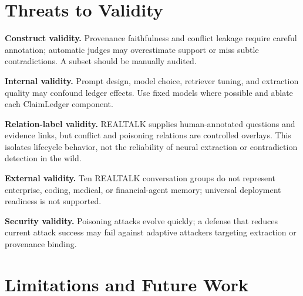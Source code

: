 \section{Threats to Validity}\label{sec:threats}

\textbf{Construct validity.} Provenance faithfulness and conflict leakage require careful annotation; automatic judges may overestimate support or miss subtle contradictions. A subset should be manually audited.

\textbf{Internal validity.} Prompt design, model choice, retriever tuning, and extraction quality may confound ledger effects. Use fixed models where possible and ablate each ClaimLedger component.

\textbf{Relation-label validity.} REALTALK supplies human-annotated questions and evidence links, but conflict and poisoning relations are controlled overlays. This isolates lifecycle behavior, not the reliability of neural extraction or contradiction detection in the wild.

\textbf{External validity.} Ten REALTALK conversation groups do not represent enterprise, coding, medical, or financial-agent memory; universal deployment readiness is not supported.

\textbf{Security validity.} Poisoning attacks evolve quickly; a defense that reduces current attack success may fail against adaptive attackers targeting extraction or provenance binding.

\section{Limitations and Future Work}\label{sec:limitations}

